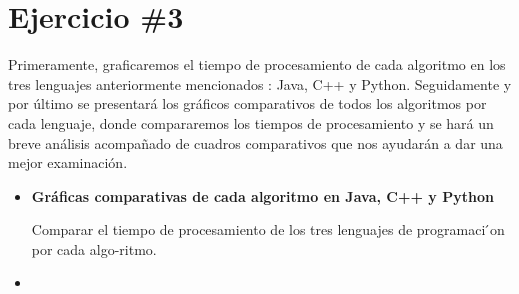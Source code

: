 \section*{Ejercicio \#3}
Primeramente, graficaremos el tiempo de procesamiento de cada algoritmo en los tres lenguajes anteriormente mencionados : Java, C++ y Python. Seguidamente y por último se presentará los gráficos comparativos de todos los algoritmos por cada lenguaje, donde compararemos los tiempos de procesamiento y se hará un breve análisis acompañado de cuadros comparativos que nos ayudarán a dar una mejor examinación.

\begin{itemize}
    \item \textbf{Gráficas comparativas de cada algoritmo en Java, C++ y Python}
    
    Comparar el tiempo de procesamiento de los tres lenguajes de programaci ́on por cada algo-ritmo. 
    \item 
\end{itemize}



























\iffalse
Como se muestra en la figuras \ref{fig:act-1_a} y \ref{fig:act-1_b}.
\begin{figure}[H]
\centering
\begin{minipage}{0.45\textwidth}
  \centering
  \texttt{[image: act-1\_a]}
  \caption{Envío de \textit{ICMP ECHO REQUEST} de PC0 a PC1, PC2 y PC3.}
  \label{fig:act-1_a}
\end{minipage}\hfill
\begin{minipage}{0.45\textwidth}
  \centering
  \texttt{[image: act-1\_b]}
  \caption{Respuesta de PC1, PC2 y PC3. Tabla ARP de PC0.}
  \label{fig:act-1_b}
\end{minipage}
\end{figure}
Como se muestra en la figura \ref{fig:act-3}
\begin{figure}[H]
  \centering
  \texttt{[image: act-3]}
  \caption{Tabla de subneteo para la red 192.168.100.0.}
  \label{fig:act-3}
\end{figure}
\fi